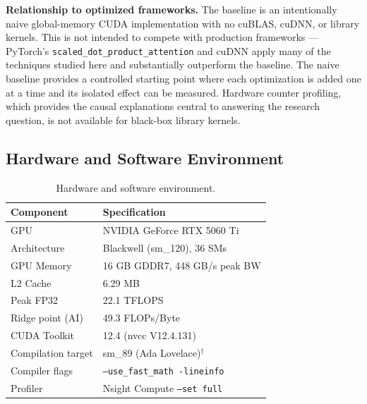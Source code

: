 \documentclass{article}
\begin{document}
\textbf{Relationship to optimized frameworks.} The baseline is an
intentionally naive global-memory CUDA implementation with no cuBLAS, cuDNN,
or library kernels. This is not intended to compete with production
frameworks — PyTorch's \texttt{scaled\_dot\_product\_attention} and cuDNN
apply many of the techniques studied here and substantially outperform the
baseline. The naive baseline provides a controlled starting point where each
optimization is added one at a time and its isolated effect can be measured.
Hardware counter profiling, which provides the causal explanations central
to answering the research question, is not available for black-box library
kernels.

\subsection{Hardware and Software Environment}

\begin{table}[ht]
\caption{Hardware and software environment.}
\label{tab:hardware}
\centering
\begin{tabular}{ll}
\hline\hline
\textbf{Component} & \textbf{Specification} \\
\hline
GPU                & NVIDIA GeForce RTX 5060 Ti \\
Architecture       & Blackwell (sm\_120), 36 SMs \\
GPU Memory         & 16 GB GDDR7, 448 GB/s peak BW \\
L2 Cache           & 6.29 MB \\
Peak FP32          & 22.1 TFLOPS \\
Ridge point (AI)   & 49.3 FLOPs/Byte \\
CUDA Toolkit       & 12.4 (nvcc V12.4.131) \\
Compilation target & sm\_89 (Ada Lovelace)$^\dagger$ \\
Compiler flags     & \texttt{--use\_fast\_math -lineinfo} \\
Profiler           & Nsight Compute \texttt{--set full} \\
\hline
\end{tabular}
\end{table}
\end{document}
